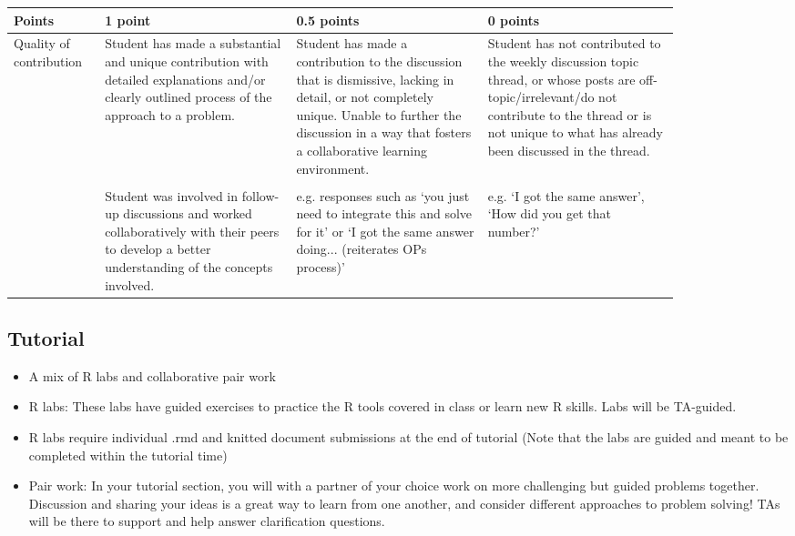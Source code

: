 \begin{center}
    \begin{tabular}{ | p{0.1\linewidth} | p{0.25\linewidth} | p{0.25\linewidth} | p{0.25\linewidth} | }
        \hline
        Points & 1 point & 0.5 points & 0 points \\
        \hline
        Quality of contribution & Student has made a substantial and unique contribution with detailed explanations and/or clearly outlined process of the approach to a problem. & Student has made a contribution to the discussion that is dismissive, lacking in detail, or not completely unique. Unable to further the discussion in a way that fosters a collaborative learning environment. & Student has not contributed to the weekly discussion topic thread, or whose posts are off-topic/irrelevant/do not contribute to the thread or is not unique to what has already been discussed in the thread. \\ & & & \\
        & Student was involved in follow-up discussions and worked collaboratively with their peers to develop a better understanding of the concepts involved. & e.g. responses such as `you just need to integrate this and solve for it' or `I got the same answer doing... (reiterates OPs process)' & e.g. `I got the same answer', `How did you get that number?' \\
        \hline
    \end{tabular}
\end{center}

\subsection*{Tutorial}

\begin{itemize}
    \item A mix of R labs and collaborative pair work 
    \item R labs: These labs have guided exercises to practice the R tools covered in class or learn new R skills. Labs will be TA-guided. 
    \item R labs require individual .rmd and knitted document submissions at the end of tutorial (Note that the labs are guided and meant to be completed within the tutorial time) 
    \item Pair work: In your tutorial section, you will with a partner of your choice work on more challenging but guided problems together. Discussion and sharing your ideas is a great way to learn from one another, and consider different approaches to problem solving! TAs will be there to support and help answer clarification questions.
\end{itemize}

